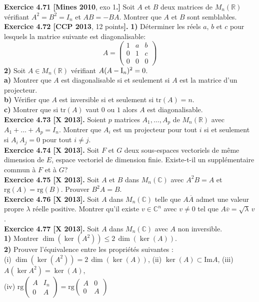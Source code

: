 \documentclass[a4paper,12pt,francais]{article}
\newcommand{\field}[1]{\mathbb{#1}}
\newcommand{\R}{\field{R}}
\newcommand{\C}{\field{C}}
\newcommand{\im}{\mbox{Im}}
\newcommand{\rg}{\mbox{rg}}
\newcommand{\tr}{\mbox{tr}}
\begin{document}
\noindent
{\bf Exercice 4.71 [Mines 2010}, exo 1{\bf.]} Soit $A$ et $B$ deux matrices de $M_n(\R)$ vérifiant $A^2=B^2=I_n$ et $AB=-BA$. Montrer que $A$ et $B$ sont semblables.\\

\noindent
{\bf Exercice 4.72 [CCP 2013}, 12 points{\bf].} 
{\bf 1)} Déterminer les réels $a$, $b$ et $c$ pour lesquels la matrice suivante est diagonalisable:
$$A= \left({
\begin{array}{ccc}
1&a&b\\
0&1&c\\
0&0&0
\end{array}}\right)$$
{\bf 2)} Soit $A\in M_n(\R)$ vérifiant $A(A-{\rm I}_n)^2=0$.\\
\indent
{\bf a)} Montrer que $A$ est diagonalisable si et seulement si $A$ est la matrice d'un projecteur.\\
\indent
{\bf b)} Vérifier que $A$ est inversible si et seulement si $\tr(A)=n$.\\
\indent
{\bf c)} Montrer que si $\tr(A)$ vaut $0$ ou $1$ alors $A$ est diagonalisable.\\

\noindent
{\bf Exercice 4.73 [X 2013].} Soient $p$ matrices $A_1, \dots,A_p$ de $M_n(\R)$ avec $A_1+\dots +A_p=I_n$. Montrer que $A_i$ est un projecteur pour tout $i$ si et seulement si $A_i\, A_j=0$ pour tout $i\neq j$.\\ 

\noindent
{\bf Exercice 4.74 [X 2013].} Soit $F$ et $G$ deux sous-espaces vectoriels de même dimension de $E$, espace vectoriel de dimension finie. Existe-t-il un supplémentaire commun à $F$ et à $G$?\\

\noindent
{\bf Exercice 4.75 [X 2013].} Soit $A$ et $B$ dans $M_n(\C)$ avec $A^2B=A$ et $\rg(A)=\rg(B)$. Prouver $B^2A=B$.\\

\noindent
{\bf Exercice 4.76 [X 2013].} Soit $A$ dans $M_n(\C)$ telle que $A \overline{A}$ admet une valeur propre $\lambda$ réelle positive. Montrer qu'il existe $v\in \C^n$ avec $v\neq 0$ tel que $A\overline{v}= \sqrt{\lambda}\, v$.\\

\noindent
{\bf Exercice 4.77 [X 2013].} Soit $A$ dans $M_n(\C)$ avec $A$ non inversible.\\
{\bf 1)} Montrer $\dim(\ker(A^2))\leqslant 2 \, \dim(\ker(A))$.\\
{\bf 2)} Prouver l'équivalence entre les propriétés suivantes :\\
\indent (i) $\dim(\ker(A^2)) = 2 \, \dim(\ker(A))$,
\hspace{1cm} (ii) $\ker(A) \subset \im A$,
\hspace{1cm} (iii) $A(\ker A^2) =\ker(A)$,\\
\indent (iv) $ 
\rg \left({\begin{array}{cc}
A&I_n\\
0&A
\end{array}}\right)
=
\rg \left({\begin{array}{cc}
A&0\\
0&A
\end{array}}\right)
$\\
\end{document}
